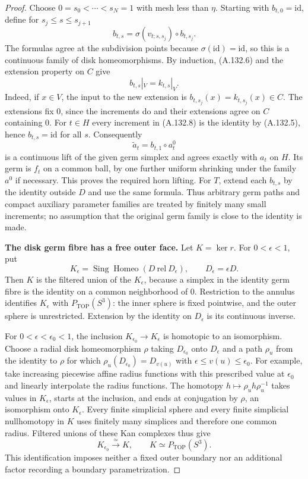 \begin{proof}
Choose $0=s_0<\cdots<s_N=1$ with mesh less than $\eta$.
Starting with $b_{t,0}=\mathrm{id}$, define for
$s_j\leq s\leq s_{j+1}$
\[
 b_{t,s}=
 \sigma(v_{t;s,s_j})\circ b_{t,s_j}.
                                                        \tag{A.132.8}
\]
The formulas agree at the subdivision points because
$\sigma(\mathrm{id})=\mathrm{id}$, so this is a continuous
family of disk homeomorphisms. By induction, (A.132.6) and the
extension property on $C$ give
\[
 b_{t,s}|_V=k_{t,s}|_V.
\]
Indeed, if $x\in V$, the input to the new extension is
$b_{t,s_j}(x)=k_{t,s_j}(x)\in C$.
The extensions fix $0$, since the increments do and their
extensions agree on $C$ containing $0$. For $t\in H$ every
increment in (A.132.8) is the identity by (A.132.5), hence
$b_{t,s}=\mathrm{id}$ for all $s$. Consequently
\[
 \widetilde a_t=b_{t,1}\circ a^0_t
\]
is a continuous lift of the given germ simplex and agrees exactly
with $a_t$ on $H$. Its germ is $f_t$ on a common ball, by one
further uniform shrinking under the family $a^0$ if necessary.
This proves the required horn lifting. For $T$, extend each
$b_{t,s}$ by the identity outside $D$ and use the same formula.
Thus arbitrary germ paths and compact auxiliary parameter families
are treated by finitely many small increments; no assumption that
the original germ family is close to the identity is made.

\smallskip\noindent
\textbf{The disk germ fibre has a free outer face.}
Let $K=\ker r$. For $0<\epsilon<1$, put
\[
 K_\epsilon=
 \operatorname{Sing}\operatorname{Homeo}(D\ \mathrm{rel}\ D_\epsilon),
 \qquad D_\epsilon=\epsilon D.
\]
Then $K$ is the filtered union of the $K_\epsilon$, because a
simplex in the identity germ fibre is the identity on a common
neighborhood of $0$. Restriction to the annulus identifies
$K_\epsilon$ with $P_{\mathrm{TOP}}(S^3)$: the inner sphere is
fixed pointwise, and the outer sphere is unrestricted. Extension
by the identity on $D_\epsilon$ is its continuous inverse.

For $0<\epsilon<\epsilon_0<1$, the inclusion
$K_{\epsilon_0}\to K_\epsilon$ is homotopic to an isomorphism.
Choose a radial disk homeomorphism $\rho$ taking
$D_{\epsilon_0}$ onto $D_\epsilon$ and a path $\rho_u$ from the
identity to $\rho$ for which
$\rho_u(D_{\epsilon_0})=D_{v(u)}$ with
$\epsilon\leq v(u)\leq\epsilon_0$. For example, take increasing
piecewise affine radius functions with this prescribed value at
$\epsilon_0$ and linearly interpolate the radius functions.
The homotopy $h\mapsto\rho_u h\rho_u^{-1}$ takes values in
$K_\epsilon$, starts at the inclusion, and ends at conjugation
by $\rho$, an isomorphism onto $K_\epsilon$.
Every finite simplicial sphere and every finite simplicial
nullhomotopy in $K$ uses finitely many simplices and therefore
one common radius. Filtered unions of these Kan complexes thus
give
\[
 K_{\epsilon_0}\xrightarrow{\simeq}K,
 \qquad K\simeq P_{\mathrm{TOP}}(S^3).
                                                        \tag{A.132.9}
\]
This identification imposes neither a fixed outer boundary nor
an additional factor recording a boundary parametrization.


\end{proof}
